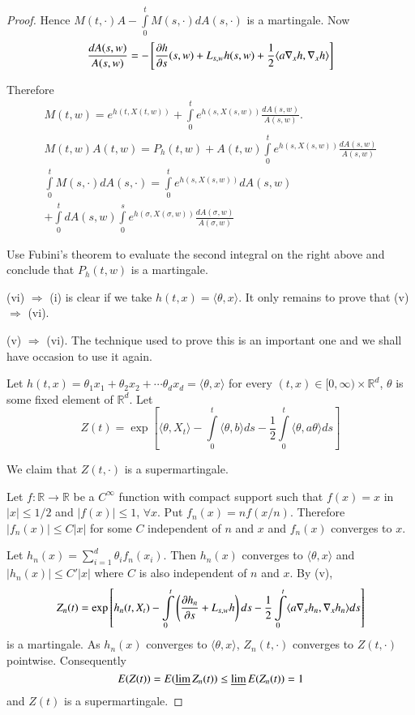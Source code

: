 \begin{proof}
Hence $M(t,\cdot)A-\int\limits^{t}_{0}M(s,\cdot)dA(s,\cdot)$ is a
martingale. Now
$$
\dfrac{dA(s,w)}{A(s,w)}=-\left[\frac{\partial h}{\partial
    s}(s,w)+L_{s,w}h(s,w)+\frac{1}{2}\langle
  a\nabla_{x}h,\nabla_{x}h\rangle\right] 
$$

Therefore
\begin{gather*}
M(t,w)=e^{h(t,X(t,w))}+\int\limits^{t}_{0}e^{h(s,X(s,w))}\frac{dA(s,w)}{A(s,w)}.\\
M(t,w)A(t,w)=P_{h}(t,w)+A(t,w)\int\limits^{t}_{0}e^{h(s,X(s,w))}\frac{dA(s,w)}{A(s,w)}\\ 
\int\limits^{t}_{0}M(s,\cdot)dA(s,\cdot)=\int\limits^{t}_{0}e^{h(s,X(s,w))}dA(s,w)\\
+\int\limits^{t}_{0}dA(s,w)\int\limits^{s}_{0}e^{h(\sigma,X(\sigma,w))}\frac{dA(\sigma,w)}{A(\sigma,w)}
\end{gather*}

Use Fubini's theorem to evaluate the second integral on the right
above and conclude that $P_{h}(t,w)$ is a martingale.

(vi) $\Rightarrow$ (i) is clear if we take $h(t,x)=\langle
\theta,x\rangle$. It only remains to prove that (v) $\Rightarrow$
(vi).

(v) $\Rightarrow$ (vi). The technique used to prove this is an
important one and we shall have occasion to use it again.

\setcounter{step}{0}
\begin{step}{0}
Let\pageoriginale
$h(t,x)=\theta_{1}x_{1}+\theta_{2}x_{2}+\cdots\theta_{d}x_{d}=\langle
\theta,x\rangle$ for every $(t,x)\in [0,\infty)\times \mathbb{R}^{d}$,
  $\theta$ is some fixed element of $\mathbb{R}^{d}$. Let
$$
Z(t)=\exp \left[\langle \theta, X_{t}\rangle
  -\int\limits^{t}_{0}\langle \theta, b\rangle
  ds-\frac{1}{2}\int\limits^{t}_{0}\langle \theta,a\theta\rangle ds\right]
$$

We claim that $Z(t,\cdot)$ is a supermartingale.
\end{step}

Let $f:\mathbb{R}\to \mathbb{R}$ be a $C^{\infty}$ function with
compact support such that $f(x)=x$ in $|x|\leq 1/2$ and $|f(x)|\leq
1$, $\forall x$. Put $f_{n}(x)=nf(x/n)$. Therefore $|f_{n}(x)|\leq
C|x|$ for some $C$ independent of $n$ and $x$ and $f_{n}(x)$ converges
to $x$.

Let $h_{n}(x)=\sum\limits^{d}_{i=1}\theta_{i}f_{n}(x_{i})$. Then
$h_{n}(x)$ converges to $\langle \theta,x\rangle$ and $|h_{n}(x)|\leq
C'|x|$ where $C$ is also independent of $n$ and $x$. By (v),
$$
Z_{n}(t)=\exp\left[h_{n}(t,X_{t})-\int\limits^{t}_{0}\left(\frac{\partial
    h_{n}}{\partial
    s}+L_{s,w}h\right)ds-\frac{1}{2}\int\limits^{t}_{0}\langle
  a\nabla_{x}h_{n},\nabla_{x}h_{n}\rangle ds\right]
$$
is a martingale. As $h_{n}(x)$ converges to $\langle \theta,x\rangle$,
$Z_{n}(t,\cdot)$ converges to $Z(t,\cdot)$ pointwise. Consequently
$$
E(Z(t))=E(\varliminf Z_{n}(t))\leq \varliminf E(Z_{n}(t))=1
$$
and $Z(t)$ is a supermartingale.


\end{proof}
